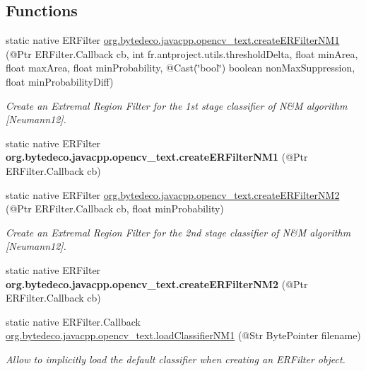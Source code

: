 \subsection*{Functions}
\begin{DoxyCompactItemize}
\item 
static native E\+R\+Filter \hyperlink{group__text__detect_ga0c01c194688152f569f28f7845cbfbaf}{org.\+bytedeco.\+javacpp.\+opencv\+\_\+text.\+create\+E\+R\+Filter\+N\+M1} (@Ptr E\+R\+Filter.\+Callback cb, int fr.antproject.utils.threshold\+Delta, float min\+Area, float max\+Area, float min\+Probability, @Cast(\char`\"{}bool\char`\"{}) boolean non\+Max\+Suppression, float min\+Probability\+Diff)
\begin{DoxyCompactList}\small\item\em Create an Extremal Region Filter for the 1st stage classifier of N\&M algorithm \mbox{[}Neumann12\mbox{]}. \end{DoxyCompactList}\item 
\mbox{\label{group__text__detect_gae88ae776bf76b390b5ca35a3a4d6b1c6}} 
static native E\+R\+Filter {\bfseries org.\+bytedeco.\+javacpp.\+opencv\+\_\+text.\+create\+E\+R\+Filter\+N\+M1} (@Ptr E\+R\+Filter.\+Callback cb)
\item 
static native E\+R\+Filter \hyperlink{group__text__detect_ga941eba7519bae9c44d6cbd21d21ad26e}{org.\+bytedeco.\+javacpp.\+opencv\+\_\+text.\+create\+E\+R\+Filter\+N\+M2} (@Ptr E\+R\+Filter.\+Callback cb, float min\+Probability)
\begin{DoxyCompactList}\small\item\em Create an Extremal Region Filter for the 2nd stage classifier of N\&M algorithm \mbox{[}Neumann12\mbox{]}. \end{DoxyCompactList}\item 
\mbox{\label{group__text__detect_ga577ae6c3236307ae6dfc2e590f41118a}} 
static native E\+R\+Filter {\bfseries org.\+bytedeco.\+javacpp.\+opencv\+\_\+text.\+create\+E\+R\+Filter\+N\+M2} (@Ptr E\+R\+Filter.\+Callback cb)
\item 
static native E\+R\+Filter.\+Callback \hyperlink{group__text__detect_gaa43a04b9408663608d30f5bcdaadac16}{org.\+bytedeco.\+javacpp.\+opencv\+\_\+text.\+load\+Classifier\+N\+M1} (@Str Byte\+Pointer filename)
\begin{DoxyCompactList}\small\item\em Allow to implicitly load the default classifier when creating an E\+R\+Filter object. \end{DoxyCompactList}\item 

\end{DoxyCompactItemize}
